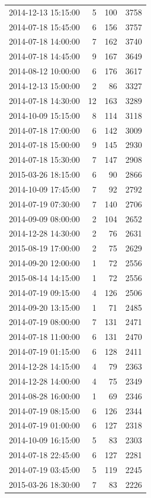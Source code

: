 \begin{tabular}{lrrr}
2014-12-13 15:15:00 & 5 & 100 & 3758 \\
2014-07-18 15:45:00 & 6 & 156 & 3757 \\
2014-07-18 14:00:00 & 7 & 162 & 3740 \\
2014-07-18 14:45:00 & 9 & 167 & 3649 \\
2014-08-12 10:00:00 & 6 & 176 & 3617 \\
2014-12-13 15:00:00 & 2 & 86 & 3327 \\
2014-07-18 14:30:00 & 12 & 163 & 3289 \\
2014-10-09 15:15:00 & 8 & 114 & 3118 \\
2014-07-18 17:00:00 & 6 & 142 & 3009 \\
2014-07-18 15:00:00 & 9 & 145 & 2930 \\
2014-07-18 15:30:00 & 7 & 147 & 2908 \\
2015-03-26 18:15:00 & 6 & 90 & 2866 \\
2014-10-09 17:45:00 & 7 & 92 & 2792 \\
2014-07-19 07:30:00 & 7 & 140 & 2706 \\
2014-09-09 08:00:00 & 2 & 104 & 2652 \\
2014-12-28 14:30:00 & 2 & 76 & 2631 \\
2015-08-19 17:00:00 & 2 & 75 & 2629 \\
2014-09-20 12:00:00 & 1 & 72 & 2556 \\
2015-08-14 14:15:00 & 1 & 72 & 2556 \\
2014-07-19 09:15:00 & 4 & 126 & 2506 \\
2014-09-20 13:15:00 & 1 & 71 & 2485 \\
2014-07-19 08:00:00 & 7 & 131 & 2471 \\
2014-07-18 11:00:00 & 6 & 131 & 2470 \\
2014-07-19 01:15:00 & 6 & 128 & 2411 \\
2014-12-28 14:15:00 & 4 & 79 & 2363 \\
2014-12-28 14:00:00 & 4 & 75 & 2349 \\
2014-08-28 16:00:00 & 1 & 69 & 2346 \\
2014-07-19 08:15:00 & 6 & 126 & 2344 \\
2014-07-19 01:00:00 & 6 & 127 & 2318 \\
2014-10-09 16:15:00 & 5 & 83 & 2303 \\
2014-07-18 22:45:00 & 6 & 127 & 2281 \\
2014-07-19 03:45:00 & 5 & 119 & 2245 \\
2015-03-26 18:30:00 & 7 & 83 & 2226 \\

\end{tabular}
